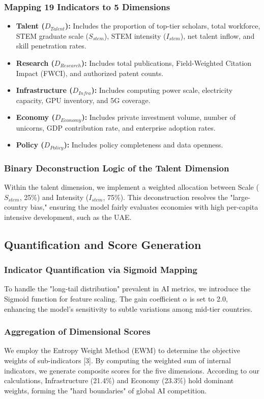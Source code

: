 \documentclass[12pt]{article}
\begin{document}
	\subsubsection{Mapping 19 Indicators to 5 Dimensions}
	\begin{itemize}
		\item \textbf{Talent ($D_{Talent}$):} Includes the proportion of top-tier scholars, total workforce, STEM graduate scale ($S_{stem}$), STEM intensity ($I_{stem}$), net talent inflow, and skill penetration rates.
		\item \textbf{Research ($D_{Research}$):} Includes total publications, Field-Weighted Citation Impact (FWCI), and authorized patent counts.
		\item \textbf{Infrastructure ($D_{Infra}$):} Includes computing power scale, electricity capacity, GPU inventory, and 5G coverage.
		\item \textbf{Economy ($D_{Economy}$):} Includes private investment volume, number of unicorns, GDP contribution rate, and enterprise adoption rates.
		\item \textbf{Policy ($D_{Policy}$):} Includes policy completeness and data openness.
	\end{itemize}
	
	\subsubsection{Binary Deconstruction Logic of the Talent Dimension}
	Within the talent dimension, we implement a weighted allocation between Scale ($S_{stem}$, 25\%) and Intensity ($I_{stem}$, 75\%). This deconstruction resolves the "large-country bias," ensuring the model fairly evaluates economies with high per-capita intensive development, such as the UAE.
	
	\subsection{Quantification and Score Generation}
	\subsubsection{Indicator Quantification via Sigmoid Mapping}
	To handle the "long-tail distribution" prevalent in AI metrics, we introduce the Sigmoid function for feature scaling. The gain coefficient $\alpha$ is set to 2.0, enhancing the model’s sensitivity to subtle variations among mid-tier countries.
	
	\subsubsection{Aggregation of Dimensional Scores}
	We employ the Entropy Weight Method (EWM) to determine the objective weights of sub-indicators [3]. By computing the weighted sum of internal indicators, we generate composite scores for the five dimensions. According to our calculations, Infrastructure (21.4\%) and Economy (23.3\%) hold dominant weights, forming the "hard boundaries" of global AI competition.
	
\end{document}
